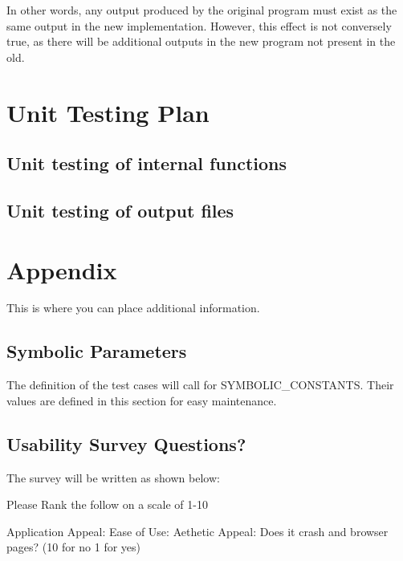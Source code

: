 \documentclass[12pt, titlepage]{article}
\begin{document}
In other words, any output produced by the original program must exist as the same output in the new implementation. However, this effect is not conversely true, as there will be additional outputs in the new program not present in the old.

				
\section{Unit Testing Plan}

		
\subsection{Unit testing of internal functions}
		
\subsection{Unit testing of output files}		
\newpage
\section{Appendix}
This is where you can place additional information.
\subsection{Symbolic Parameters}
The definition of the test cases will call for SYMBOLIC\_CONSTANTS.
Their values are defined in this section for easy maintenance.
\subsection{Usability Survey Questions?}
The survey will be written as shown below:

Please Rank the follow on a scale of 1-10

Application Appeal:
Ease of Use:
Aethetic Appeal:
Does it crash and browser pages? (10 for no 1 for yes)
\end{document}
